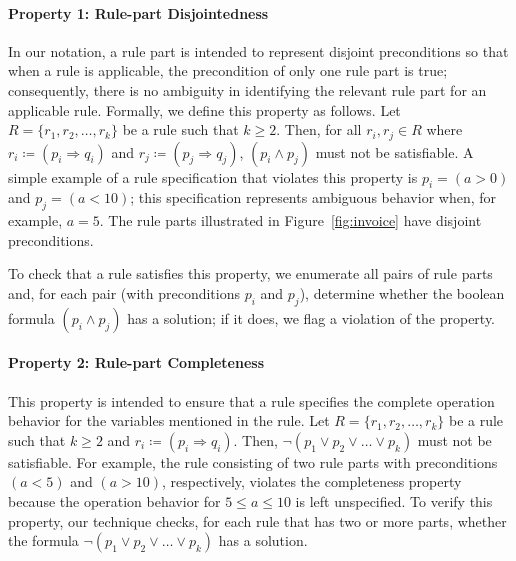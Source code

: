 \paragraph*{Property 1: Rule-part Disjointedness}
In our notation, a rule part is intended to represent disjoint preconditions so
that when a rule is applicable, the precondition of only one rule part is true;
consequently, there is no ambiguity in identifying the relevant rule part for an
applicable rule. Formally, we define this property as follows. Let $R= \{r_1,
r_2, \ldots, r_k\}$ be a rule such that $k \geq 2$. Then, for all $r_i, r_j \in
R$ where $ r_i \coloneqq (p_i \Longrightarrow q_i)$ and $r_j \coloneqq (p_j
\Longrightarrow q_j)$, $(p_i \wedge p_j)$ must not be satisfiable. A simple
example of a rule specification that violates this property is $p_i = (a > 0)$
and $p_j = (a < 10)$; this specification represents ambiguous behavior when, for
example, $a = 5$.  The rule parts illustrated in Figure~\ref{fig:invoice} have
disjoint preconditions.

To check that a rule satisfies this property, we enumerate all pairs of rule
parts and, for each pair (with preconditions $p_i$ and $p_j$), determine whether
the boolean formula $(p_i \wedge p_j)$ has a solution; if it does, we flag a
violation of the property.

\paragraph*{Property 2: Rule-part Completeness}
This property is intended to ensure that a rule specifies the complete operation
behavior for the variables mentioned in the rule. Let $R= \{r_1, r_2, \ldots,
r_k\}$ be a rule such that $k \geq 2$ and $r_i \coloneqq (p_i \Longrightarrow
q_i)$. Then, $\neg(p_1 \vee p_2 \vee \ldots \vee p_k)$ must not be
satisfiable. For example, the rule consisting of two rule parts with
preconditions $(a < 5)$ and $(a > 10)$, respectively, violates the completeness
property because the operation behavior for $5 \leq a \leq 10$ is left
unspecified.  To verify this property, our technique checks, for each rule that
has two or more parts, whether the formula $\neg(p_1 \vee p_2 \vee \ldots \vee
p_k)$ has a solution.

